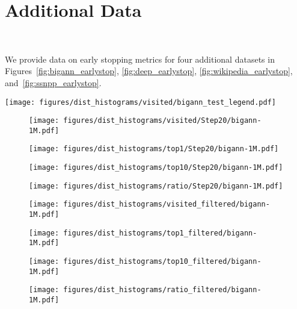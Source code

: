 \clearpage
\appendix

\section{Additional Data}~\label{apdx}

We provide data on early stopping metrics for four additional datasets in Figures~\ref{fig:bigann_earlystop}, \ref{fig:deep_earlystop}, \ref{fig:wikipedia_earlystop}, and~\ref{fig:ssnpp_earlystop}.

\begin{figure*}
	\centering
	\texttt{[image: figures/dist\_histograms/visited/bigann\_test\_legend.pdf]} \\
	\begin{subfigure}{.24\textwidth}
		\texttt{[image: figures/dist\_histograms/visited/Step20/bigann-1M.pdf]}
	\end{subfigure}
	\begin{subfigure}{.24\textwidth}
		\texttt{[image: figures/dist\_histograms/top1/Step20/bigann-1M.pdf]}
	\end{subfigure}
	\begin{subfigure}{.24\textwidth}
		\texttt{[image: figures/dist\_histograms/top10/Step20/bigann-1M.pdf]}
	\end{subfigure}
	\begin{subfigure}{.24\textwidth}
		\texttt{[image: figures/dist\_histograms/ratio/Step20/bigann-1M.pdf]}
	\end{subfigure}
	\begin{subfigure}{.24\textwidth}
		\texttt{[image: figures/dist\_histograms/visited\_filtered/bigann-1M.pdf]}
	\end{subfigure}
	\begin{subfigure}{.24\textwidth}
		\texttt{[image: figures/dist\_histograms/top1\_filtered/bigann-1M.pdf]}
	\end{subfigure}
	\begin{subfigure}{.24\textwidth}
		\texttt{[image: figures/dist\_histograms/top10\_filtered/bigann-1M.pdf]}
	\end{subfigure}
	\begin{subfigure}{.24\textwidth}
		\texttt{[image: figures/dist\_histograms/ratio\_filtered/bigann-1M.pdf]}
	\end{subfigure}
	\caption{Early stopping metrics for BIGANN-1M, taken at step 20 of a beam search with beam 100. The top row shows all results, while the bottom row shows only results for beam searches that have not yet found a candidate within the radius.}
	\label{fig:bigann_earlystop}
\end{figure*}

